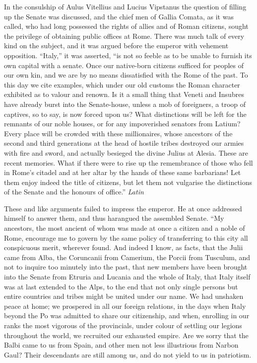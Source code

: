 In the consulship of Aulus Vitellius and Lucius Vipstanus the question of filling up the Senate was discussed, and the chief men of Gallia Comata, as it was called, who had long possessed the rights of allies and of Roman citizens, sought the privilege of obtaining public offices at Rome. There was much talk of every kind on the subject, and it was argued before the emperor with vehement opposition. ``Italy,'' it was asserted, ``is not so feeble as to be unable to furnish its own capital with a senate. Once our native-born citizens sufficed for peoples of our own kin, and we are by no means dissatisfied with the Rome of the past. To this day we cite examples, which under our old customs the Roman character exhibited as to valour and renown. Is it a small thing that Veneti and Insubres have already burst into the Senate-house, unless a mob of foreigners, a troop of captives, so to say, is now forced upon us? What distinctions will be left for the remnants of our noble houses, or for any impoverished senators from Latium? Every place will be crowded with these millionaires, whose ancestors of the second and third generations at the head of hostile tribes destroyed our armies with fire and sword, and actually besieged the divine Julius at Alesia. These are recent memories. What if there were to rise up the remembrance of those who fell in Rome's citadel and at her altar by the hands of these same barbarians! Let them enjoy indeed the title of citizens, but let them not vulgarise the distinctions of the Senate and the honours of office.'' \emph{Latin}


These and like arguments failed to impress the emperor. He at once addressed himself to answer them, and thus harangued the assembled Senate. ``My ancestors, the most ancient of whom was made at once a citizen and a noble of Rome, encourage me to govern by the same policy of transferring to this city all conspicuous merit, wherever found. And indeed I know, as facts, that the Julii came from Alba, the Coruncanii from Camerium, the Porcii from Tusculum, and not to inquire too minutely into the past, that new members have been brought into the Senate from Etruria and Lucania and the whole of Italy, that Italy itself was at last extended to the Alps, to the end that not only single persons but entire countries and tribes might be united under our name. We had unshaken peace at home; we prospered in all our foreign relations, in the days when Italy beyond the Po was admitted to share our citizenship, and when, enrolling in our ranks the most vigorous of the provincials, under colour of settling our legions throughout the world, we recruited our exhausted empire. Are we sorry that the Balbi came to us from Spain, and other men not less illustrious from Narbon Gaul? Their descendants are still among us, and do not yield to us in patriotism.

